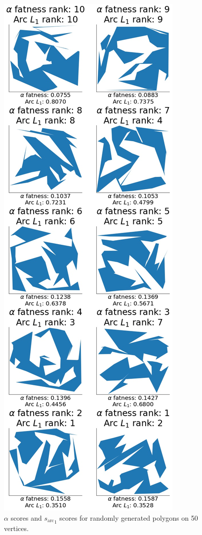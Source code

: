 \documentclass[]{jocg}
\newcommand{\chordarc}{{s_{\textrm{arc}}}}
\theoremstyle{definition}
\theoremstyle{remark}
\begin{document}
\begin{figure}[t]
  \centering
  \includegraphics[height=0.8\textheight]{../plots/u_50_alpha_score_chord_arc_one_vertices_0-05_delta_ranking.jpg}
  \caption{$\alpha$ scores and ${\chordarc}_{1}$ scores for randomly
  generated polygons on 50 vertices.}
  \label{fig:alph-one-50}
\end{figure}
\end{document}

